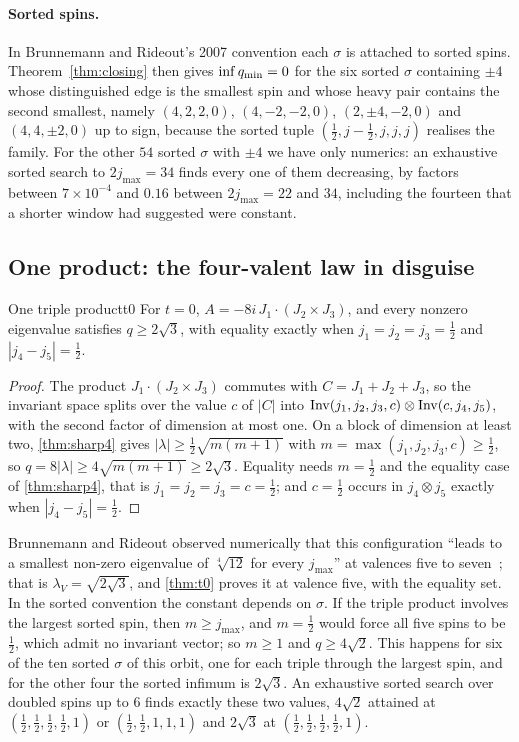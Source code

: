 \paragraph{Sorted spins.}
In Brunnemann and Rideout's 2007 convention each $\sigma$ is attached to sorted spins.
Theorem~\ref{thm:closing} then gives $\inf q_{\min}=0$ for the six sorted $\sigma$
containing $\pm4$ whose distinguished edge is the smallest spin and whose heavy pair
contains the second smallest, namely $(4,2,2,0)$, $(4,-2,-2,0)$, $(2,\pm4,-2,0)$ and
$(4,4,\pm2,0)$ up to sign, because the sorted tuple $(\frac12,j-\frac12,j,j,j)$
realises the family. For the other $54$ sorted $\sigma$ with $\pm4$ we have only
numerics: an exhaustive sorted search to $2j_{\max}=34$ finds every one of them
decreasing, by factors between $7\times10^{-4}$ and $0.16$ between $2j_{\max}=22$ and
$34$, including the fourteen that a shorter window had suggested were constant.

\subsection{One product: the four-valent law in disguise}

\begin{theorem}{One triple product}{t0}
For $t=0$, $A=-8i\,J_1\cdot(J_2\times J_3)$, and every nonzero eigenvalue satisfies
$q\ge2\sqrt3$, with equality exactly when $j_1=j_2=j_3=\frac12$ and $|j_4-j_5|=\frac12$.
\end{theorem}

\begin{proof}
The product $J_1\cdot(J_2\times J_3)$ commutes with $C=J_1+J_2+J_3$, so the invariant
space splits over the value $c$ of $|C|$ into $\operatorname{Inv}(j_1,j_2,j_3,c)\otimes\operatorname{Inv}(c,j_4,j_5)$,
with the second factor of dimension at most one. On a block of dimension at least two,
\cref{thm:sharp4} gives $|\lambda|\ge\frac12\sqrt{m(m+1)}$ with $m=\max(j_1,j_2,j_3,c)
\ge\frac12$, so $q=8|\lambda|\ge4\sqrt{m(m+1)}\ge2\sqrt3$. Equality needs $m=\frac12$
and the equality case of \cref{thm:sharp4}, that is $j_1=j_2=j_3=c=\frac12$; and
$c=\frac12$ occurs in $j_4\otimes j_5$ exactly when $|j_4-j_5|=\frac12$.
\end{proof}

Brunnemann and Rideout observed numerically that this configuration ``leads to a
smallest non-zero eigenvalue of $\sqrt[4]{12}$ for every $j_{\max}$'' at valences five
to seven~\cite[p.~35]{BR2010}; that is $\lambda_V=\sqrt{2\sqrt3}$, and
\cref{thm:t0} proves it at valence five, with the equality set. In the sorted
convention the constant depends on $\sigma$. If the triple product involves the
largest sorted spin, then $m\ge j_{\max}$, and $m=\frac12$ would force all five spins to
be $\frac12$, which admit no invariant vector; so $m\ge1$ and $q\ge4\sqrt2$. This
happens for six of the ten sorted $\sigma$ of this orbit, one for each triple through
the largest spin, and for the other four the sorted infimum is $2\sqrt3$. An exhaustive
sorted search over doubled spins up to $6$ finds exactly these two values, $4\sqrt2$
attained at $(\frac12,\frac12,\frac12,\frac12,1)$ or $(\frac12,\frac12,1,1,1)$ and
$2\sqrt3$ at $(\frac12,\frac12,\frac12,\frac12,1)$.
